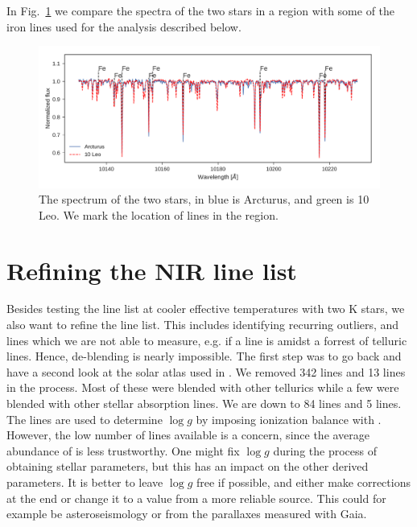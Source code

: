 \documentclass{aa}
\begin{document}
In Fig.~\ref{fig:both} we compare the spectra of the two stars in a region with
some of the iron lines used for the analysis described below.

\begin{figure}[tpb]
    \centering
    \includegraphics[width=1.0\linewidth]{figures/bothspectra.pdf}
    \caption{The spectrum of the two stars, in blue is Arcturus, and green is
             10 Leo. We mark the location of  lines in the region.}
    \label{fig:both}
\end{figure}





\section{Refining the NIR line list}
\label{sec:refining_the_line_list}

Besides testing the line list at cooler effective temperatures with two K stars,
we also want to refine the line list. This includes identifying recurring
outliers, and lines which we are not able to measure, e.g. if a line is amidst a
forrest of telluric lines. Hence, de-blending is nearly impossible. The first
step was to go back and have a second look at the solar atlas used in
\citet{Andreasen2016}. We removed 342  lines and 13 
lines in the process. Most of these were blended with other tellurics while a
few were blended with other stellar absorption lines. We are down to 84
 lines and 5  lines. The  lines are used to
determine $\log g$ by imposing ionization balance with . However, the
low number of  lines available is a concern, since the average
abundance of  is less trustworthy. One might fix $\log g$ during the
process of obtaining stellar parameters, but this has an impact on the other
derived parameters. It is better to leave $\log g$ free if possible, and either
make corrections at the end or change it to a value from a more reliable source.
This could for example be asteroseismology or from the parallaxes measured with
Gaia.
\end{document}
